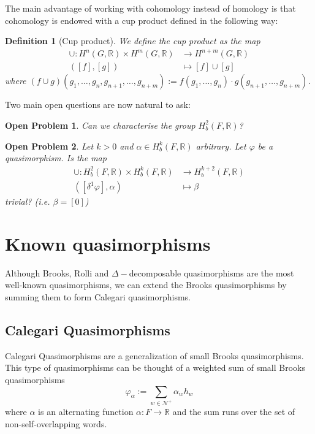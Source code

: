 \documentclass[leqno]{article}
\newtheorem*{definition}{Definition}
\newtheorem*{openproblem}{Open Problem}
\begin{document}
The main advantage of working with cohomology instead of homology is that cohomology is endowed with a cup product defined in the following way:

 \begin{definition}[Cup product] We define the cup product as the map
\begin{align*}
  \cup : H^n(G, \mathbb{R}) \times H^m(G, \mathbb{R}) &\to H^{n+m}(G, \mathbb{R}) \\
  ([f], [g]) & \mapsto [f]\cup [g] 
\end{align*} 
where $(f\cup g)(g_1, \ldots, g_n, g_{n+1}, \ldots, g_{n+m}) := f(g_1, \ldots, g_n)\cdot g(g_{n+1}, \ldots, g_{n+m})$.
\end{definition}

Two main open questions are now natural to ask:

\begin{openproblem} Can we characterise the group $H^2_b(F, \mathbb{R})$?
\end{openproblem}

\begin{openproblem} Let  $k>0$ and  $\alpha \in H^k_b(F, \mathbb{R})$ arbitrary. Let $\varphi $ be a quasimorphism. Is  the map
  \begin{align*}
	\cup : H^2_b(F, \mathbb{R}) \times H_b^k(F, \mathbb{R}) &\to H^{k+2}_b(F, \mathbb{R}) \\
	([\delta^1\varphi], \alpha ) &\mapsto \beta 
  \end{align*}
  trivial? (i.e. $\beta =[0]$)
\end{openproblem}

\section{Known quasimorphisms} 
Although Brooks, Rolli and $\Delta -$decomposable quasimorphisms are the most well-known quasimorphisms, we can extend the Brooks quasimorphisms by summing them to form Calegari quasimorphisms.

\subsection{Calegari Quasimorphisms}
Calegari Quasimorphisms are a generalization of small Brooks quasimorphisms. This type of quasimorphisms can be thought of a weighted sum of small Brooks quasimorphisms
\[
\varphi _\alpha := \sum_{w\in \mathcal{N}^+} \alpha _w h_w
\] 
where $\alpha $ is an alternating function $\alpha :F\to \mathbb{R}$ and the sum runs over the set of non-self-overlapping words.
\end{document}
